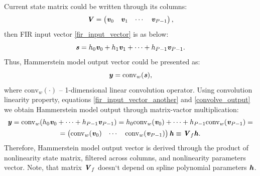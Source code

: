 \documentclass[12pt]{article}
\newcommand{\bit}[1]{\ensuremath{\textbf{\textit{#1}}}}
\begin{document}
Current state matrix could be written through its columns:
\begin{equation}
    \bit{V}=\begin{pmatrix}
        \bit{v}_0 & \bit{v}_1 & \cdots & \bit{v}_{P-1}
    \end{pmatrix},
    \label{vand_matrix}
\end{equation}
then FIR input vector \eqref{fir_input_vector} is as below:
\begin{equation}
    \bit{s}=h_0\bit{v}_0+h_1\bit{v}_1+\cdots+h_{P-1}\bit{v}_{P-1}.
    \label{fir_input_vector_another}
\end{equation}
Thus, Hammerstein model output vector could be presented as:
\begin{equation}
    \bit{y}=\text{conv}_{w}(\bit{s}),
    \label{convolve_output}
\end{equation}
where $\text{conv}_{w}(\cdot)$ -- 1-dimensional linear convolution operator. Using convolution linearity property, equations \eqref{fir_input_vector_another} and \eqref{convolve_output} we obtain Hammerstein model output through matrix-vactor multiplication:
\begin{multline}
    \bit{y}=\text{conv}_{w}(h_0\bit{v}_0+\cdots+h_{P-1}\bit{v}_{P-1})
    =h_0\text{conv}_{w}(\bit{v}_0)+\cdots+h_{P-1}\text{conv}_{w}(\bit{v}_{P-1})= \\
    =\begin{pmatrix}
        \text{conv}_{w}(\bit{v}_0) & \cdots & \text{conv}_{w}(\bit{v}_{P-1})
    \end{pmatrix}\bit{h}\equiv\bit{V}_f\bit{h}.
    \label{nonlin_output}
\end{multline}
Therefore, Hammerstein model output vector is derived through the product of nonlinearity state matrix, filtered across columns, and nonlinearity parameters vector. Note, that matrix $\bit{V}_f$ doesn`t depend on spline polynomial parameters \bit{h}.
\end{document}
